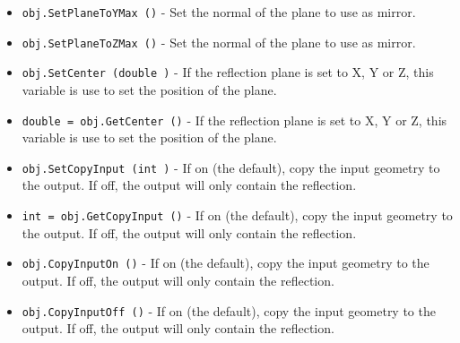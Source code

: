 \begin{itemize}
\item  \verb|obj.SetPlaneToYMax ()| -  Set the normal of the plane to use as mirror.

\item  \verb|obj.SetPlaneToZMax ()| -  Set the normal of the plane to use as mirror.

\item  \verb|obj.SetCenter (double )| -  If the reflection plane is set to X, Y or Z, this variable
 is use to set the position of the plane.

\item  \verb|double = obj.GetCenter ()| -  If the reflection plane is set to X, Y or Z, this variable
 is use to set the position of the plane.

\item  \verb|obj.SetCopyInput (int )| -  If on (the default), copy the input geometry to the output. If off,
 the output will only contain the reflection.

\item  \verb|int = obj.GetCopyInput ()| -  If on (the default), copy the input geometry to the output. If off,
 the output will only contain the reflection.

\item  \verb|obj.CopyInputOn ()| -  If on (the default), copy the input geometry to the output. If off,
 the output will only contain the reflection.

\item  \verb|obj.CopyInputOff ()| -  If on (the default), copy the input geometry to the output. If off,
 the output will only contain the reflection.

\end{itemize}

